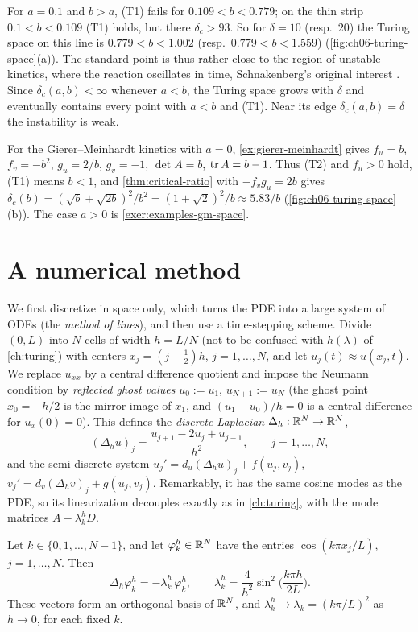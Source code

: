 For $a=0.1$ and $b>a$, (T1) fails for $0.109<b<0.779$; on the thin strip
$0.1<b<0.109$ (T1) holds, but there $\delta_c>93$. So for $\delta=10$ (resp.\ $20$) the
Turing space on this line is $0.779<b<1.002$ (resp.\ $0.779<b<1.559$)
(\cref{fig:ch06-turing-space}(a)). The
standard point is thus rather close to the region of unstable kinetics, where the
reaction oscillates in time, Schnakenberg's original interest \cite{Schnakenberg1979}.
Since $\delta_c(a,b)<\infty$ whenever $a<b$, the Turing space grows with $\delta$ and
eventually contains every point with $a<b$ and (T1). Near its edge
$\delta_c(a,b)=\delta$ the instability is weak.

For the Gierer--Meinhardt kinetics with $a=0$, \cref{ex:gierer-meinhardt} gives
$f_u=b$, $f_v=-b^2$, $g_u=2/b$, $g_v=-1$, $\det A=b$, $\operatorname{tr} A=b-1$. Thus (T2) and
$f_u>0$ hold, (T1) means $b<1$, and \cref{thm:critical-ratio} with $-f_vg_u=2b$ gives
$\delta_c(b)=(\sqrt b+\sqrt{2b})^2/b^2=(1+\sqrt2)^2/b\approx5.83/b$
(\cref{fig:ch06-turing-space}(b)). The case $a>0$ is \cref{exer:examples-gm-space}.

\section{A numerical method}\label{sec:numerics}

We first discretize in space only, which turns the PDE into a large system of ODEs
(the \emph{method of lines}), and then use a time-stepping scheme. Divide $(0,L)$ into
$N$ cells of width $h=L/N$ (not to be confused with $h(\lambda)$ of \cref{ch:turing})
with centers $x_j=(j-\frac12)h$, $j=1,\dots,N$, and let $u_j(t)\approx u(x_j,t)$. We
replace $u_{xx}$ by a central difference quotient and impose the Neumann condition by
\emph{reflected ghost values} $u_0:=u_1$, $u_{N+1}:=u_N$ (the ghost point $x_0=-h/2$
is the mirror image of $x_1$, and $(u_1-u_0)/h=0$ is a central difference for
$u_x(0)=0$). This defines the \emph{discrete Laplacian} $\Delta_h:\mathbb{R}^N\to\mathbb{R}^N$,
\begin{equation}\label{eq:discrete-laplacian}
  (\Delta_hu)_j=\frac{u_{j+1}-2u_j+u_{j-1}}{h^2},\qquad j=1,\dots,N,
\end{equation}
and the semi-discrete system $u_j'=d_u(\Delta_hu)_j+f(u_j,v_j)$,
$v_j'=d_v(\Delta_hv)_j+g(u_j,v_j)$. Remarkably, it has the same cosine modes as the PDE,
so its linearization decouples exactly as in \cref{ch:turing}, with the mode matrices
$A-\lambda^h_kD$.

\begin{proposition}\label{prop:examples-discrete-modes}
Let $k\in\{0,1,\dots,N-1\}$, and let $\varphi^h_k\in\mathbb{R}^N$ have the entries
$\cos(k\pi x_j/L)$, $j=1,\dots,N$. Then
\begin{equation*}
  \Delta_h\varphi^h_k=-\lambda^h_k\,\varphi^h_k,\qquad
  \lambda^h_k=\frac4{h^2}\sin^2\Big(\frac{k\pi h}{2L}\Big).
\end{equation*}
These vectors form an orthogonal basis of $\mathbb{R}^N$, and $\lambda^h_k\to\lambda_k=(k\pi/L)^2$
as $h\to0$, for each fixed $k$.
\end{proposition}

